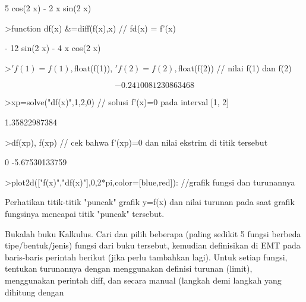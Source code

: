 \documentclass[a4paper,10pt]{article}
\begin{document}
\begin{eulernotebook}
\begin{eulercomment}
\begin{eulercomment}
\begin{eulercomment}
\begin{eulercomment}
\begin{euleroutput}
                        5 cos(2 x) - 2 x sin(2 x)
  
\end{euleroutput}
\begin{eulerprompt}
>function df(x) &=diff(f(x),x) // fd(x) = f'(x)
\end{eulerprompt}
\begin{euleroutput}
  
                       - 12 sin(2 x) - 4 x cos(2 x)
  
\end{euleroutput}
\begin{eulerprompt}
>$'f(1)=f(1), $float(f(1)), $'f(2)=f(2), $float(f(2)) // nilai f(1) dan f(2)
\end{eulerprompt}
\begin{eulerformula}
\[
-0.2410081230863468
\]
\end{eulerformula}
\begin{eulerprompt}
>xp=solve("df(x)",1,2,0) // solusi f'(x)=0 pada interval [1, 2]
\end{eulerprompt}
\begin{euleroutput}
  1.35822987384
\end{euleroutput}
\begin{eulerprompt}
>df(xp), f(xp) // cek bahwa f'(xp)=0 dan nilai ekstrim di titik tersebut
\end{eulerprompt}
\begin{euleroutput}
  0
  -5.67530133759
\end{euleroutput}
\begin{eulerprompt}
>plot2d(["f(x)","df(x)"],0,2*pi,color=[blue,red]): //grafik fungsi dan turunannya
\end{eulerprompt}
\begin{eulercomment}
Perhatikan titik-titik "puncak" grafik y=f(x) dan nilai turunan pada saat grafik fungsinya mencapai titik "puncak" tersebut.
\end{eulercomment}
\begin{eulercomment}
Bukalah buku Kalkulus. Cari dan pilih beberapa (paling sedikit 5 fungsi berbeda tipe/bentuk/jenis) fungsi dari buku tersebut,
kemudian definisikan di EMT pada baris-baris perintah berikut (jika perlu tambahkan lagi). Untuk setiap fungsi, tentukan turunannya
dengan menggunakan definisi turunan (limit), menggunakan perintah diff, dan secara manual (langkah demi langkah yang dihitung dengan

\end{eulercomment}
\end{eulercomment}
\end{eulercomment}
\end{eulercomment}
\end{eulercomment}
\end{eulernotebook}
\end{document}
